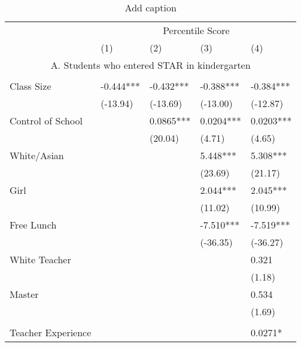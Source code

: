 \documentclass{article}
\begin{document}
\begin{table}[htbp]
  \centering
  \caption{Add caption}
    \begin{tabular}{lllrr}
    \toprule
          & \multicolumn{4}{c}{Percentile Score} \\
          & (1)   & (2)   & \multicolumn{1}{l}{(3)} & \multicolumn{1}{l}{(4)} \\
    \midrule
    \multicolumn{5}{c}{A. Students who entered STAR in kindergarten} \\
          &       &       &       &  \\
    Class Size & -0.444*** & -0.432*** & \multicolumn{1}{l}{-0.388***} & \multicolumn{1}{l}{-0.384***} \\
          & (-13.94) & (-13.69) & \multicolumn{1}{l}{(-13.00)} & \multicolumn{1}{l}{(-12.87)} \\
    Control of School &       & 0.0865*** & \multicolumn{1}{l}{0.0204***} & \multicolumn{1}{l}{0.0203***} \\
          &       & (20.04) & \multicolumn{1}{l}{(4.71)} & \multicolumn{1}{l}{(4.65)} \\
    White/Asian &       &       & \multicolumn{1}{l}{5.448***} & \multicolumn{1}{l}{5.308***} \\
          &       &       & \multicolumn{1}{l}{(23.69)} & \multicolumn{1}{l}{(21.17)} \\
    Girl  &       &       & \multicolumn{1}{l}{2.044***} & \multicolumn{1}{l}{2.045***} \\
          &       &       & \multicolumn{1}{l}{(11.02)} & \multicolumn{1}{l}{(10.99)} \\
    Free Lunch &       &       & \multicolumn{1}{l}{-7.510***} & \multicolumn{1}{l}{-7.519***} \\
          &       &       & \multicolumn{1}{l}{(-36.35)} & \multicolumn{1}{l}{(-36.27)} \\
    White Teacher &       &       & \multicolumn{1}{l}{} & \multicolumn{1}{l}{0.321} \\
          &       &       & \multicolumn{1}{l}{} & \multicolumn{1}{l}{(1.18)} \\
    Master &       &       & \multicolumn{1}{l}{} & \multicolumn{1}{l}{0.534} \\
          &       &       & \multicolumn{1}{l}{} & \multicolumn{1}{l}{(1.69)} \\
          &       &       &       &  \\
    Teacher Experience &       &       & \multicolumn{1}{l}{} & \multicolumn{1}{l}{0.0271*} \\

\end{tabular}
\end{table}
\end{document}

